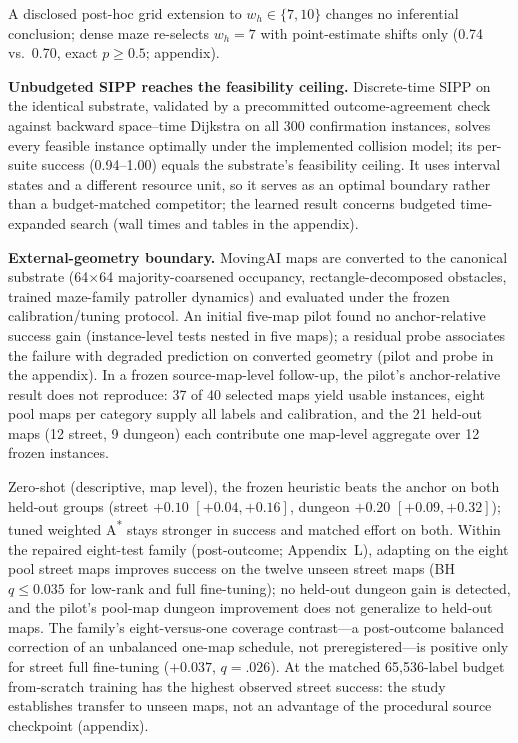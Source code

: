 \documentclass[letterpaper]{article} %
\begin{document}
A disclosed post-hoc grid extension to $w_h \in \{7, 10\}$ changes no inferential conclusion; dense maze re-selects $w_h{=}7$ with point-estimate shifts only (0.74 vs.\ 0.70, exact $p \geq 0.5$; appendix).

\textbf{Unbudgeted SIPP reaches the feasibility ceiling.} Discrete-time SIPP \citep{phillips2011sipp} on the identical substrate, validated by a precommitted outcome-agreement check against backward space--time Dijkstra on all 300 confirmation instances, solves every feasible instance optimally under the implemented collision model; its per-suite success (0.94--1.00) equals the substrate's feasibility ceiling. It uses interval states and a different resource unit, so it serves as an optimal boundary rather than a budget-matched competitor; the learned result concerns budgeted time-expanded search (wall times and tables in the appendix).

\textbf{External-geometry boundary.} MovingAI maps \citep{sturtevant2012movingai} are converted to the canonical substrate (64$\times$64 majority-coarsened occupancy, rectangle-decomposed obstacles, trained maze-family patroller dynamics) and evaluated under the frozen calibration/tuning protocol. An initial five-map pilot found no anchor-relative success gain (instance-level tests nested in five maps); a residual probe associates the failure with degraded prediction on converted geometry (pilot and probe in the appendix). In a frozen source-map-level follow-up, the pilot's anchor-relative result does not reproduce: 37 of 40 selected maps yield usable instances, eight pool maps per category supply all labels and calibration, and the 21 held-out maps (12 street, 9 dungeon) each contribute one map-level aggregate over 12 frozen instances.

Zero-shot (descriptive, map level), the frozen heuristic beats the anchor on both held-out groups (street $+0.10$ $[+0.04,+0.16]$, dungeon $+0.20$ $[+0.09,+0.32]$); tuned weighted A\textsuperscript{*} stays stronger in success and matched effort on both. Within the repaired eight-test family (post-outcome; Appendix~L), adapting on the eight pool street maps improves success on the twelve unseen street maps (BH $q \leq 0.035$ for low-rank and full fine-tuning); no held-out dungeon gain is detected, and the pilot's pool-map dungeon improvement does not generalize to held-out maps. The family's eight-versus-one coverage contrast---a post-outcome balanced correction of an unbalanced one-map schedule, not preregistered---is positive only for street full fine-tuning ($+0.037$, $q{=}.026$). At the matched 65{,}536-label budget from-scratch training has the highest observed street success: the study establishes transfer to unseen maps, not an advantage of the procedural source checkpoint (appendix).
\end{document}
